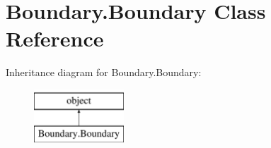 \hypertarget{class_boundary_1_1_boundary}{}\section{Boundary.\+Boundary Class Reference}
\label{class_boundary_1_1_boundary}
Inheritance diagram for Boundary.\+Boundary\+:\begin{figure}[H]
\begin{center}
\leavevmode
\includegraphics[height=2.000000cm]{class_boundary_1_1_boundary}
\end{center}
\end{figure}
